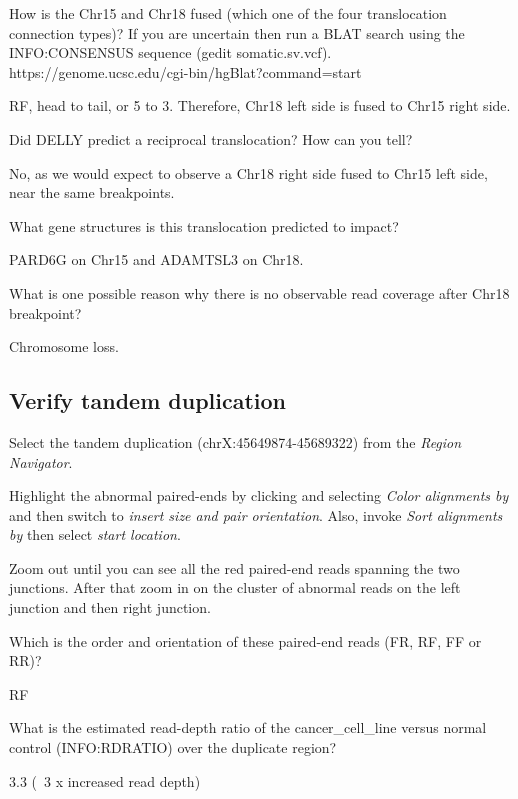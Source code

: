 \begin{questions}
How is the Chr15 and Chr18 fused (which one of the four translocation connection types)? \newline
If you are uncertain then run a BLAT search using the INFO:CONSENSUS sequence (gedit  somatic.sv.vcf). https://genome.ucsc.edu/cgi-bin/hgBlat?command=start
\begin{answer}
RF, head to tail, or 5 to 3. Therefore, Chr18 left side is fused to Chr15 right side.
\end{answer}
Did DELLY predict a reciprocal translocation? How can you tell? 
\begin{answer}
No, as we would expect to observe a Chr18 right side fused to Chr15 left side, near the same breakpoints.  
\end{answer}
What gene structures is this translocation predicted to impact? 
\begin{answer}
PARD6G on Chr15 and ADAMTSL3 on Chr18.
\end{answer}
What is one possible reason why there is no observable read coverage after Chr18 breakpoint? 
\begin{answer}
Chromosome loss.
\end{answer}
\end{questions}



\subsection{Verify tandem duplication}
\begin{advanced}
\begin{steps}
Select the tandem duplication (chrX:45649874-45689322) from the \emph{Region Navigator}.

Highlight the abnormal paired-ends by clicking and selecting \emph{Color alignments by} and then switch to \emph{insert size and pair orientation}. Also, invoke \emph{Sort alignments by} then select \emph{start location}.

Zoom out until you can see all the red paired-end reads spanning the two junctions. After that zoom in on the cluster of abnormal reads on the left junction and then right junction.
\end{steps}
\end{advanced}

\begin{questions}
Which is the order and orientation of these paired-end reads (FR, RF, FF or RR)? 
\begin{answer}
RF
\end{answer}
What is the estimated read-depth ratio of the cancer\_cell\_line versus normal control (INFO:RDRATIO) over the duplicate region? 
\begin{answer}
3.3 (~3 x increased read depth) 
\end{answer}
\end{questions}


